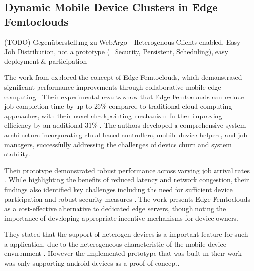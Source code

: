 \subsection{Dynamic Mobile Device Clusters in
Edge Femtoclouds}
(TODO) Gegenüberstellung zu WebArgo - Heterogenous Clients enabled, Easy Job Distribution, not a prototype (=Security, Persistent, Scheduling), easy deployment \& participation

The work from \citeauthor{relatedwork:mobilecloud} \cite{relatedwork:mobilecloud} explored the concept of Edge Femtoclouds, which demonstrated significant performance improvements through collaborative mobile edge computing \cite{relatedwork:mobilecloud}. Their experimental results show that Edge Femtoclouds can reduce job completion time by up to 26\% compared to traditional cloud computing approaches, with their novel checkpointing mechanism further improving efficiency by an additional 31\% \cite{relatedwork:mobilecloud}. The authors developed a comprehensive system architecture incorporating cloud-based controllers, mobile device helpers, and job managers, successfully addressing the challenges of device churn and system stability. 

Their prototype demonstrated robust performance across varying job arrival rates \cite{relatedwork:mobilecloud}. While highlighting the benefits of reduced latency and network congestion, their findings also identified key challenges including the need for sufficient device participation and robust security measures \cite{relatedwork:mobilecloud}. The work presents Edge Femtoclouds as a cost-effective alternative to dedicated edge servers, though noting the importance of developing appropriate incentive mechanisms for device owners.

They stated that the support of heterogen devices is a important feature for such a application, due to the heterogeneous characteristic of the mobile device environment \cite{relatedwork:mobilecloud}. However the implemented prototype that was built in their work was only supporting android devices as a proof of concept.